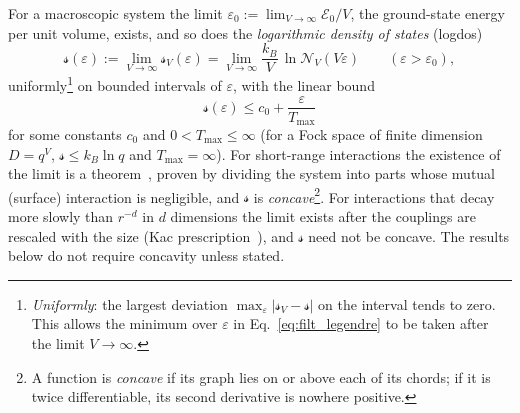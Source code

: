 \documentclass[10pt,a4paper]{article}
\theoremstyle{plain}
\newcommand{\cN}{\mathcal{N}}   %
\newcommand{\lndos}{{logdos}}  %
\newcommand{\enrg}{\mathcal{E}}  %
\newcommand{\lds}{\mathscr{s}}  %
\newcommand{\Tmax}{T_{\max}}  %
\begin{document}
For a macroscopic system the limit
$\varepsilon_0:=\lim_{V\to\infty}\enrg_0/V$, the ground-state energy per unit
volume, exists, and so does the
\emph{logarithmic density of states} (\lndos)
\begin{equation}\label{eq:filt_sdef}
  \lds(\varepsilon) := \lim_{V\to\infty}\lds_V(\varepsilon)
  =\lim_{V\to\infty}\frac{k_B}{V}\,\ln\cN_V(V\varepsilon)
  \qquad(\varepsilon>\varepsilon_0) ,
\end{equation}
uniformly\footnote{\emph{Uniformly}: the largest deviation
$\max_\varepsilon|\lds_V-\lds|$ on the interval tends to zero. This allows
the minimum over $\varepsilon$ in Eq.~\eqref{eq:filt_legendre} to be taken
after the limit $V\to\infty$.} on bounded intervals of $\varepsilon$, with
the linear bound
\begin{equation}\label{eq:filt_linbound}
  \lds(\varepsilon)\le c_0+\frac{\varepsilon}{\Tmax}
\end{equation}
for some constants $c_0$ and $0<\Tmax\le\infty$ (for a Fock space of finite
dimension $D=q^{V}$, $\lds\le k_B\ln q$ and $\Tmax=\infty$). For short-range
interactions the existence of the limit is a theorem~\cite{Ruelle}, proven
by dividing the system into parts whose mutual (surface) interaction is
negligible, and $\lds$ is \emph{concave}\footnote{A function is
\emph{concave} if its graph lies on or above each of its chords; if it is
twice differentiable, its second derivative is nowhere positive.}. For
interactions that decay more slowly than $r^{-d}$ in $d$ dimensions the
limit exists after the couplings are rescaled with the size (Kac
prescription~\cite{Campa2009}), and $\lds$ need not be concave. The results
below do not require concavity unless stated.
\end{document}

